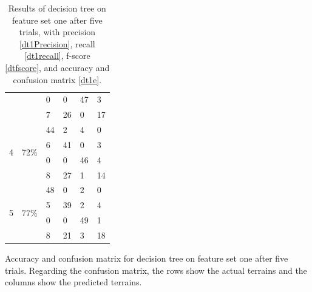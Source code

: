 \documentclass[USenglish]{ifimaster}  %
\begin{document}
\begin{table}[h]
\begin{subtable}[h]{1\textwidth}
\begin{tabular}{@{}llllll@{}}
		\multicolumn{1}{l|}{} & \multicolumn{1}{l|}{} & \multicolumn{1}{l|}{0} & \multicolumn{1}{l|}{0} & \multicolumn{1}{l|}{47} & 3 \\ \cmidrule(l){3-6} 
		\multicolumn{1}{l|}{} & \multicolumn{1}{l|}{} & \multicolumn{1}{l|}{7} & \multicolumn{1}{l|}{26} & \multicolumn{1}{l|}{0} & 17 \\ \midrule
		\multicolumn{1}{l|}{\multirow{4}{*}{4}} & \multicolumn{1}{l|}{\multirow{4}{*}{72\%}} & \multicolumn{1}{l|}{44} & \multicolumn{1}{l|}{2} & \multicolumn{1}{l|}{4} & 0 \\ \cmidrule(l){3-6} 
		\multicolumn{1}{l|}{} & \multicolumn{1}{l|}{} & \multicolumn{1}{l|}{6} & \multicolumn{1}{l|}{41} & \multicolumn{1}{l|}{0} & 3 \\ \cmidrule(l){3-6} 
		\multicolumn{1}{l|}{} & \multicolumn{1}{l|}{} & \multicolumn{1}{l|}{0} & \multicolumn{1}{l|}{0} & \multicolumn{1}{l|}{46} & 4 \\ \cmidrule(l){3-6} 
		\multicolumn{1}{l|}{} & \multicolumn{1}{l|}{} & \multicolumn{1}{l|}{8} & \multicolumn{1}{l|}{27} & \multicolumn{1}{l|}{1} & 14 \\ \midrule
		\multicolumn{1}{l|}{\multirow{4}{*}{5}} & \multicolumn{1}{l|}{\multirow{4}{*}{77\%}} & \multicolumn{1}{l|}{48} & \multicolumn{1}{l|}{0} & \multicolumn{1}{l|}{2} & 0 \\ \cmidrule(l){3-6} 
		\multicolumn{1}{l|}{} & \multicolumn{1}{l|}{} & \multicolumn{1}{l|}{5} & \multicolumn{1}{l|}{39} & \multicolumn{1}{l|}{2} & 4 \\ \cmidrule(l){3-6} 
		\multicolumn{1}{l|}{} & \multicolumn{1}{l|}{} & \multicolumn{1}{l|}{0} & \multicolumn{1}{l|}{0} & \multicolumn{1}{l|}{49} & 1 \\ \cmidrule(l){3-6} 
		\multicolumn{1}{l|}{} & \multicolumn{1}{l|}{} & \multicolumn{1}{l|}{8} & \multicolumn{1}{l|}{21} & \multicolumn{1}{l|}{3} & 18 \\ \bottomrule
	\end{tabular}
	\caption{Accuracy and confusion matrix for decision tree on feature set one after five trials. Regarding the confusion matrix, the rows show the actual terrains and the columns show the predicted terrains.}
	\label{dt1e}
	\end{subtable}
	\caption[Results of decision tree on feature set one with RFLV]{Results of decision tree on feature set one after five trials, with precision \ref{dt1Precision}, recall \ref{dt1recall}, f-score \ref{dtfscore}, and accuracy and confusion matrix \ref{dt1e}.}
\label{dt1e222}
\end{table}
\FloatBarrier
\newpage
\end{document}
